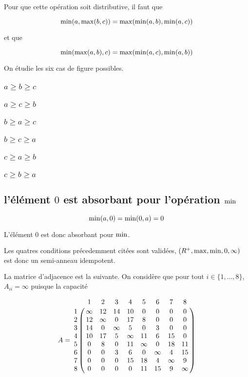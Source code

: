 \documentclass{article}
\begin{document}
Pour que cette opération soit distributive, il faut que

$$
\operatorname{min}(a, \operatorname{max}(b,c))
=
\operatorname{max}(\operatorname{min}(a,b),\operatorname{min}(a,c))
$$

et que

$$
\operatorname{min}(\operatorname{max}(a,b),c)
=
\operatorname{max}(\operatorname{min}(a,c),\operatorname{min}(a,b))
$$

On étudie les six cas de figure possibles.

\subsubsection{$a \geq b \geq c$}
\subsubsection{$a \geq c \geq b$}
\subsubsection{$b \geq a \geq c$}
\subsubsection{$b \geq c \geq a$}
\subsubsection{$c \geq a \geq b$}
\subsubsection{$c \geq b \geq a$}

\subsection{l'élément  $0$ est absorbant pour l'opération $\operatorname{min}$}

$$
\operatorname{min}(a,0) = \operatorname{min}(0,a) = 0
$$

L'élément $0$ est donc absorbant pour $\operatorname{min}$.

Les quatres conditions précedemment citées sont validées, $(R^+,
\operatorname{max}, \operatorname{min}, 0, \infty)$ est donc un
semi-anneau idempotent.

La matrice d'adjacence est la suivante. On considère que pour tout $i
\in \{1,\dots,8\}$, $A_{ii} = \infty$ puisque la capacité

$$
A = \bordermatrix{
    & 1 & 2 & 3 & 4 & 5 & 6 & 7 & 8 \cr
  1 & \infty & 12 & 14 & 10 & 0 & 0 & 0 & 0 \cr
  2 & 12 & \infty & 0 & 17 & 8 & 0 & 0 & 0 \cr
  3 & 14 & 0 & \infty & 5 & 0 & 3 & 0 & 0 \cr
  4 & 10 & 17 & 5 & \infty & 11 & 6 & 15 & 0 \cr
  5 & 0 & 8 & 0 & 11 & \infty & 0 & 18 & 11 \cr
  6 & 0 & 0 & 3 & 6 & 0 & \infty & 4 & 15 \cr
  7 & 0 & 0 & 0 & 15 & 18 & 4 & \infty & 9 \cr
  8 & 0 & 0 & 0 & 0 & 11 & 15 & 9 & \infty
}
$$
\end{document}
